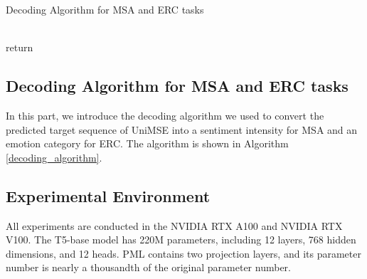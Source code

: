 \documentclass[11pt]{article}
\begin{document}
\begin{table}[t]
\caption{The distribution of emotion category on dataset IEMOCAP.}
\label{tab:iemocap_dist}
\end{table}

\begin{algorithm}[h]
\caption{Decoding Algorithm for MSA and ERC tasks}\label{decoding_algorithm}
\LinesNumbered {}~~\\
  return 
\end{algorithm}

\subsection{Decoding Algorithm for MSA and ERC tasks}
\label{sec:dccoding}
In this part, we introduce the decoding algorithm we used to convert the predicted target sequence of UniMSE into a sentiment intensity for MSA and an emotion category for ERC. The algorithm is shown in Algorithm \ref{decoding_algorithm}.

\subsection{Experimental Environment}
\label{sec:environment}
All experiments are conducted in the NVIDIA RTX A100 and NVIDIA RTX V100. The T5-base model has 220M parameters, including 12 layers, 768 hidden dimensions, and 12 heads. PML contains two projection layers, and its parameter number is nearly a thousandth of the original parameter number.
\end{document}
